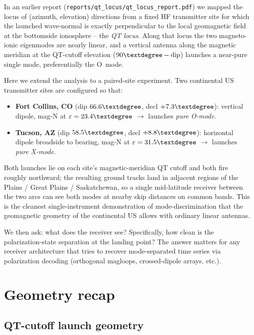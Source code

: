 \documentclass[11pt]{article}
\begin{document}
In an earlier report (\texttt{reports/qt\_locus/qt\_locus\_report.pdf})
we mapped the locus of (azimuth, elevation) directions from a fixed
HF transmitter site for which the launched wave-normal is exactly
perpendicular to the local geomagnetic field at the bottomside
ionosphere -- the \emph{QT locus}.  Along that locus the two
magneto-ionic eigenmodes are nearly linear, and a vertical antenna
along the magnetic meridian at the QT-cutoff elevation
($90\textdegree-\text{dip}$) launches a near-pure single mode,
preferentially the O~mode.

Here we extend the analysis to a paired-site experiment.  Two
continental US transmitter sites are configured so that:

\begin{itemize}
\item \textbf{Fort Collins, CO} (dip $66.6\textdegree$, decl
$+7.3\textdegree$): vertical dipole, mag-N at $\varepsilon=23.4\textdegree$
$\to$ launches \emph{pure O-mode}.
\item \textbf{Tucson, AZ} (dip $58.5\textdegree$, decl $+8.8\textdegree$):
horizontal dipole broadside to bearing, mag-N at $\varepsilon=31.5\textdegree$
$\to$ launches \emph{pure X-mode}.
\end{itemize}

Both launches lie on each site's magnetic-meridian QT cutoff and
both fire roughly northward; the resulting ground tracks land in
adjacent regions of the Plains / Great Plains / Saskatchewan, so
a single mid-latitude receiver between the two arcs can see both
modes at nearby skip distances on common bands.  This is the
cleanest single-instrument demonstration of mode-discrimination
that the geomagnetic geometry of the continental US allows with
ordinary linear antennas.

We then ask: what does the receiver see?  Specifically, how clean
is the polarization-state separation at the landing point?  The
answer matters for any receiver architecture that tries to recover
mode-separated time series via polarization decoding (orthogonal
magloops, crossed-dipole arrays, etc.).


\section{Geometry recap}

\subsection*{QT-cutoff launch geometry}
\end{document}
